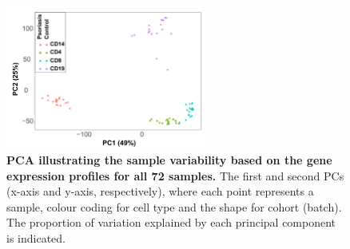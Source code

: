 


\begin{figure}[htbp]
	\centering
	\includegraphics[width=0.6\textwidth]{./Results2/pdfs/PS_CTL_all_samples_varied_PCA1and2_plot}
	\caption[PCA illustrating the sample variability based on the gene expression profiles for all 72 samples.]{\textbf{PCA illustrating the sample variability based on the gene expression profiles for all 72 samples.} The first and second PCs (x-axis and y-axis, respectively), where each point represents a sample, colour coding for cell type and the shape for cohort (batch). The proportion of variation explained by each principal component is indicated.}
	\label{figure:RNAseq_PCA_all}
\end{figure}


